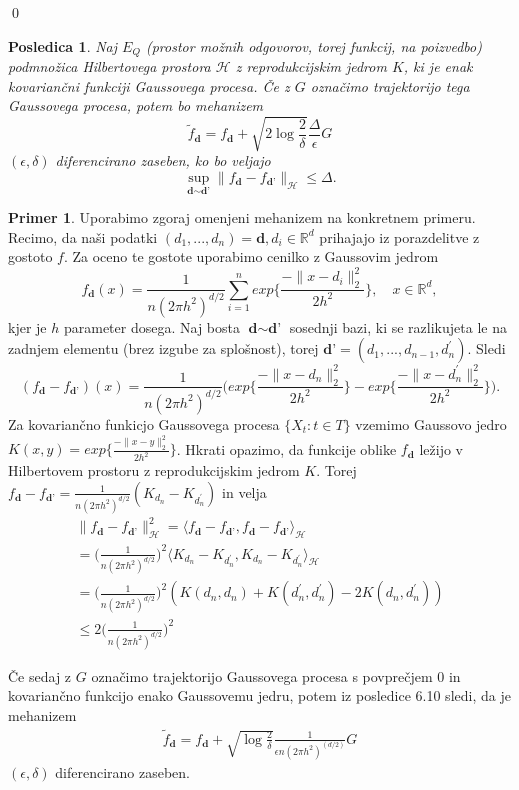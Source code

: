 \documentclass[12pt,a4paper]{amsart}
\theoremstyle{definition} %
\newtheorem{primer}[definicija]{Primer}
\theoremstyle{plain} %
\newtheorem{posledica}[definicija]{Posledica}
\begin{document}
\qed
\begin{posledica}
Naj $E_Q$ (prostor možnih odgovorov, torej funkcij, na poizvedbo) podmnožica Hilbertovega prostora $\mathcal{H}$ z reprodukcijskim jedrom $K$, ki je enak kovariančni funkciji Gaussovega procesa. Če z $G$ označimo trajektorijo tega Gaussovega procesa, potem bo mehanizem 
$$
\widetilde{f}_{\textbf{d}} = f_{\textbf{d}} + \sqrt{2\log{\frac{2}{\delta}}} \frac{\Delta}{\epsilon}G
$$
$(\epsilon,\delta)$ diferencirano zaseben, ko bo veljajo 
$$
\sup_{\textbf{d} \sim \textbf{d'}} \| f_{\textbf{d}} -  f_{\textbf{d'}} \|_{\mathcal{H}} \leq \Delta.
$$
\end{posledica}
 
\begin{primer}
Uporabimo zgoraj omenjeni mehanizem na konkretnem primeru. Recimo, da naši podatki $(d_1,...,d_n) = \textbf{d}, d_i \in \mathbb{R}^d$ prihajajo iz porazdelitve z gostoto $f$. Za oceno te gostote uporabimo cenilko z Gaussovim jedrom
$$
f_{\textbf{d}}(x) = \frac{1}{n(2\pi h^2)^{d/2}} \sum_{i=1}^{n} exp\Big\{\frac{-\|x-d_i\|_{2}^{2}}{2h^2}\Big\},  \quad x \in \mathbb{R}^d,
$$
kjer je $h$ parameter dosega. Naj bosta $\textbf{d} \sim \textbf{d'}$ sosednji bazi, ki se razlikujeta le na zadnjem elementu (brez izgube za splošnost), torej $\textbf{d'} = (d_1,...,d_{n-1},d_{n}^{\prime}) $. Sledi
$$
(f_{\textbf{d}} - f_{\textbf{d'}})(x) = \frac{1}{n(2\pi h^2)^{d/2}} \Big(exp\Big\{\frac{-\|x-d_n\|_{2}^{2}}{2h^2}\Big\}-exp\Big\{\frac{-\|x-d_{n}^{\prime}\|_{2}^{2}}{2h^2}\Big\}\Big).
$$
Za kovariančno funkicjo Gaussovega procesa $\{X_t : t \in T \}$ vzemimo Gaussovo jedro $K(x,y) = exp\{\frac{-\|x-y\|_{2}^{2}}{2h^2}\}$. Hkrati opazimo, da funkcije oblike $f_{\textbf{d}}$ ležijo v Hilbertovem prostoru z reprodukcijskim jedrom $K$. Torej $f_{\textbf{d}} - f_{\textbf{d'}} = \frac{1}{n(2\pi h^2)^{d/2}} (K_{d_n}-K_{d_{n}^{\prime}})$ in velja 
\begin{gather*}
\|f_{\textbf{d}} - f_{\textbf{d'}}\|_{\mathcal{H}}^{2} = \langle f_{\textbf{d}} - f_{\textbf{d'}}, f_{\textbf{d}} - f_{\textbf{d'}} \rangle_{\mathcal{H}}  \\ 
= \Big(\frac{1}{n(2\pi h^2)^{d/2}}\Big)^2 \langle K_{d_n}-K_{d_{n}^{\prime}}, K_{d_n}-K_{d_{n}^{\prime}} \rangle_{\mathcal{H}}  \\
= \Big(\frac{1}{n(2\pi h^2)^{d/2}}\Big)^2 (K(d_n, d_n)+K(d_{n}^{\prime}, d_{n}^{\prime})-2K(d_n, d_{n}^{\prime})) \\ 
\leq 2 \Big(\frac{1}{n(2\pi h^2)^{d/2}}\Big)^2
\end{gather*}

Če sedaj z $G$ označimo trajektorijo Gaussovega procesa s povprečjem 0 in kovariančno funkcijo enako Gaussovemu jedru, potem iz posledice 6.10 sledi, da je mehanizem 
\begin{gather*}
\widetilde{f}_{\textbf{d}} = f_{\textbf{d}} + \sqrt{\log{\frac{2}{\delta}}} \frac{1}{\epsilon n (2\pi h^2)^{(d/2)}}G
\end{gather*}
$(\epsilon, \delta)$ diferencirano zaseben.
\end{primer}
\end{document}
